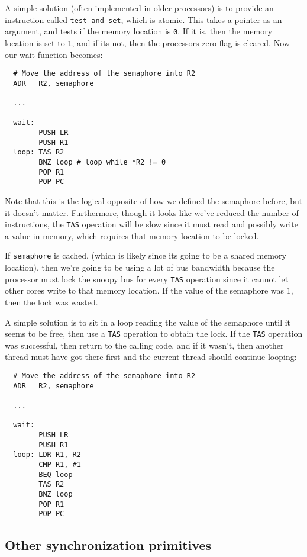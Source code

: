 A simple solution (often implemented in older processors) is to provide an
instruction called \texttt{test and set}, which is atomic. This takes a pointer
as an argument, and tests if the memory location is \texttt{0}. If it is, then
the memory location is set to \texttt{1}, and if its not, then the processors
zero flag is cleared. Now our wait function becomes:

\begin{verbatim}
  # Move the address of the semaphore into R2
  ADR   R2, semaphore

  ...

  wait:
        PUSH LR
        PUSH R1
  loop: TAS R2
        BNZ loop # loop while *R2 != 0
        POP R1
        POP PC
\end{verbatim}

Note that this is the logical opposite of how we defined the semaphore before,
but it doesn't matter. Furthermore, though it looks like we've reduced the
number of instructions, the \texttt{TAS} operation will be slow since it must
read and possibly write a value in memory, which requires that memory location
to be locked.

If \texttt{semaphore} is cached, (which is likely since its going to be a shared
memory location), then we're going to be using a lot of bus bandwidth because
the processor must lock the snoopy bus for every \texttt{TAS} operation since it
cannot let other cores write to that memory location. If the value of the
semaphore was $1$, then the lock was wasted.

A simple solution is to sit in a loop reading the value of the semaphore until
it seems to be free, then use a \texttt{TAS} operation to obtain the lock. If
the \texttt{TAS} operation was successful, then return to the calling code, and
if it wasn't, then another thread must have got there first and the current
thread should continue looping:

\begin{verbatim}
  # Move the address of the semaphore into R2
  ADR   R2, semaphore

  ...

  wait:
        PUSH LR
        PUSH R1
  loop: LDR R1, R2
        CMP R1, #1
        BEQ loop
        TAS R2
        BNZ loop
        POP R1
        POP PC
\end{verbatim}

\subsection{Other synchronization primitives}

